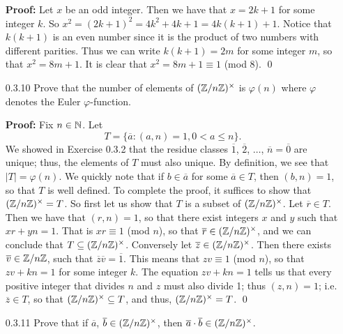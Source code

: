 \begin{enumerate}
      \textbf{Proof:} Let $x$ be an odd integer. Then we have that $x = 2k + 1$
      for some integer $k$. So $x^2 = (2k + 1)^2 = 4k^2 + 4k + 1 =
      4k(k + 1) + 1$. Notice that $k(k + 1)$ is an even number since it is the
      product of two numbers with different parities. Thus we can write
      $k(k + 1) = 2m$ for some integer $m$, so that $x^2 = 8m + 1$. It is clear
      that $x^2 = 8m + 1 \equiv 1$ (mod 8). \qed
   \item[0.3.10]  Prove that the number of elements of $(\mathbb{Z}/n\mathbb{Z})^\times$ is
                  $\varphi(n)$ where $\varphi$ denotes the Euler
                  $\varphi$-function.
                  
      \textbf{Proof:} Fix $n \in \mathbb{N}$. Let
      $$T = \{\overline{a} : (a, n) = 1, 0 < a \le n\}.$$
      We showed in Exercise 0.3.2 that the residue classes $\overline{1}$,
      $\overline{2}$, $\ldots$, $\overline{n} = \overline{0}$ are unique; thus, 
      the elements of $T$ must also unique. By definition, we see that
      $|T| = \varphi(n)$. We quickly note that if $b \in \overline{a}$ for some
      $\overline{a} \in T$, then $(b, n) = 1$, so that $T$ is well defined.
      To complete the proof, it suffices to show that $(\mathbb{Z}/n\mathbb{Z})^\times = T$. So
      first let us show that $T$ is a subset of $(\mathbb{Z}/n\mathbb{Z})^\times$. Let
      $\overline{r} \in T$. Then we have that $(r, n) = 1$, so that there exist 
      integers $x$ and $y$ such that $xr + yn = 1$. That is
      $xr \equiv 1$ (mod $n$), so that $\overline{r} \in (\mathbb{Z}/n\mathbb{Z})^\times$, and
      we can conclude that $T \subseteq (\mathbb{Z}/n\mathbb{Z})^\times$. Conversely let
      $\overline{z} \in (\mathbb{Z}/n\mathbb{Z})^\times$. Then there exists
      $\overline{v} \in \mathbb{Z}/n\mathbb{Z}$, such that
      $\overline{z}\overline{v} = \overline{1}$. This means that
      $zv \equiv 1$ (mod $n$), so that $zv + kn = 1$ for some integer $k$. The
      equation $zv + kn = 1$ tells us that every positive integer that divides 
      $n$ and $z$ must also divide 1; thus $(z, n) = 1$; i.e.
      $\overline{z} \in T$, so that $(\mathbb{Z}/n\mathbb{Z})^\times \subseteq T$, and thus,
      $(\mathbb{Z}/n\mathbb{Z})^\times = T$. \qed
   \item[0.3.11]  Prove that if $\overline{a}$,
                  $\overline{b} \in (\mathbb{Z}/n\mathbb{Z})^\times$, then
                  $\overline{a} \cdot \overline{b} \in (\mathbb{Z}/n\mathbb{Z})^\times$.


\end{enumerate}
